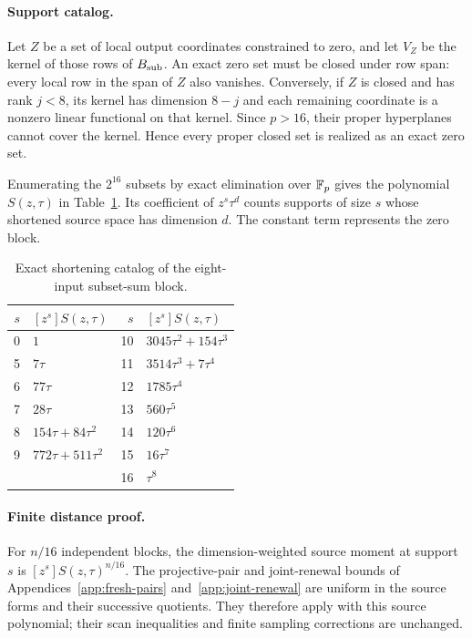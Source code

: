 \paragraph{Support catalog.}
Let $Z$ be a set of local output coordinates constrained to zero, and let
$V_Z$ be the kernel of those rows of $B_{\rm sub}$. An exact zero set
must be closed under row span: every local row in the span of $Z$ also
vanishes. Conversely, if $Z$ is closed and has rank $j<8$, its kernel
has dimension $8-j$ and each remaining coordinate is a nonzero linear
functional on that kernel. Since $p>16$, their proper hyperplanes cannot
cover the kernel. Hence every proper closed set is realized as an exact
zero set.

Enumerating the $2^{16}$ subsets by exact elimination over $\mathbb F_p$ gives
the polynomial $S(z,\tau)$ in Table~\ref{tab:subset-source}. Its coefficient
of $z^s\tau^d$ counts supports of size $s$ whose shortened source space
has dimension $d$. The constant term represents the zero block.

\begin{table}[t]
\centering
\caption{Exact shortening catalog of the eight-input subset-sum block.}
\label{tab:subset-source}
\begin{tabular}{rl@{\qquad}rl}
\toprule
$s$ & $[z^s]S(z,\tau)$ & $s$ & $[z^s]S(z,\tau)$\\
\midrule
0 & $1$ & 10 & $3045\tau^2+154\tau^3$\\
5 & $7\tau$ & 11 & $3514\tau^3+7\tau^4$\\
6 & $77\tau$ & 12 & $1785\tau^4$\\
7 & $28\tau$ & 13 & $560\tau^5$\\
8 & $154\tau+84\tau^2$ & 14 & $120\tau^6$\\
9 & $772\tau+511\tau^2$ & 15 & $16\tau^7$\\
 & & 16 & $\tau^8$\\
\bottomrule
\end{tabular}
\end{table}

\paragraph{Finite distance proof.}
For $n/16$ independent blocks, the dimension-weighted source moment at
support $s$ is $[z^s]S(z,\tau)^{n/16}$. The projective-pair and
joint-renewal bounds of Appendices~\ref{app:fresh-pairs}
and~\ref{app:joint-renewal} are uniform in the source forms and their
successive quotients. They therefore apply with this source polynomial;
their scan inequalities and finite sampling corrections are unchanged.


